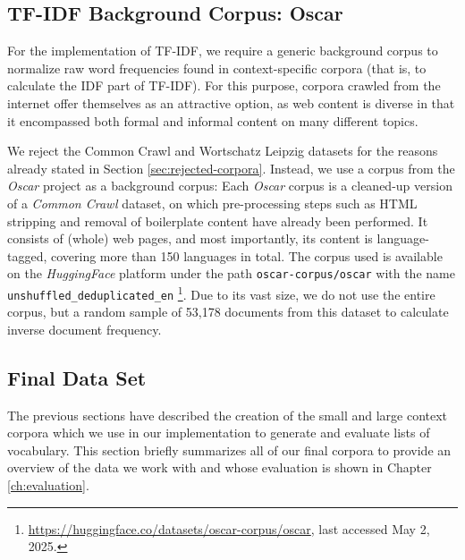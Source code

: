 \subsection{TF-IDF Background Corpus: Oscar} \label{sec:oscar}
For the implementation of TF-IDF, we require a generic background corpus to normalize raw word frequencies found in context-specific corpora (that is, to calculate the IDF part of TF-IDF).
For this purpose, corpora crawled from the internet offer themselves as an attractive option, as web content is diverse in that it encompassed both formal and informal content on many different topics.

We reject the Common Crawl and Wortschatz Leipzig datasets for the reasons already stated in Section \ref{sec:rejected-corpora}.
Instead, we use a corpus from the \textit{Oscar} project \cite{suarezAsynchronousPipelineProcessing2019} as a background corpus:
Each \textit{Oscar} corpus is a cleaned-up version of a \textit{Common Crawl} dataset, on which pre-processing steps such as HTML stripping and removal of boilerplate content have already been performed.
It consists of (whole) web pages, and most importantly, its content is language-tagged, covering more than 150 languages in total.
The corpus used is available on the \textit{HuggingFace} platform under the path \texttt{oscar-corpus/oscar} with the name \texttt{unshuffled\_deduplicated\_en} \footnote{\url{https://huggingface.co/datasets/oscar-corpus/oscar}, last accessed May 2, 2025.}.
Due to its vast size, we do not use the entire corpus, but a random sample of 53,178 documents from this dataset to calculate inverse document frequency.

\subsection{Final Data Set} \label{sec:final-dataset}
The previous sections have described the creation of the small and large context corpora which we use in our implementation to generate and evaluate lists of vocabulary.
This section briefly summarizes all of our final corpora to provide an overview of the data we work with and whose evaluation is shown in Chapter \ref{ch:evaluation}.

